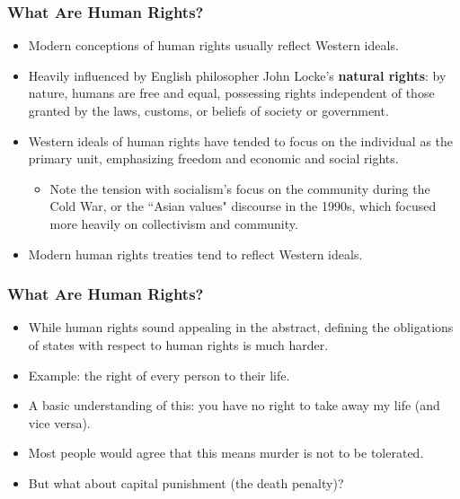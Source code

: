 \documentclass[handout]{beamer}
\begin{document}
\begin{frame} 
	\frametitle{\LARGE{What Are Human Rights?}}
	\begin{itemize}
		\item Modern conceptions of human rights usually reflect Western ideals. \pause
		\item Heavily influenced by English philosopher John Locke's \textbf{natural rights}: by nature, humans are free and equal, possessing rights independent of those granted by the laws, customs, or beliefs of society or government. \pause
		\item Western ideals of human rights have tended to focus on the individual as the primary unit, emphasizing freedom and economic and social rights. \pause
		\begin{itemize}
			\item Note the tension with socialism's focus on the community during the Cold War, or the ``Asian values" discourse in the 1990s, which focused more heavily on collectivism and community. \pause
		\end{itemize}
		\item Modern human rights treaties tend to reflect Western ideals.		
	\end{itemize}
\end{frame}

\begin{frame} 
	\frametitle{\LARGE{What Are Human Rights?}}
	\begin{itemize}
		\item While human rights sound appealing in the abstract, defining the obligations of states with respect to human rights is much harder.
		\item Example: the right of every person to their life. \pause
		\item A basic understanding of this: you have no right to take away my life (and vice versa). \pause
		\item Most people would agree that this means murder is not to be tolerated. \pause
		\item But what about capital punishment (the death penalty)?	
	\end{itemize}
\end{frame}
\end{document}
